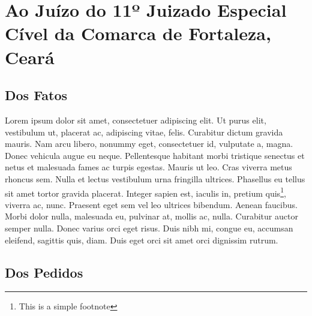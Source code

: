 \documentclass[
  12pt,
	oneside,
	a4paper,
	english,			%
	french,				%
	spanish,			%
  brazil
]{memoir}
\begin{document}
  \AddToShipoutPicture{\BackgroundPic}

\chapter{Ao Juízo do 11º Juizado Especial Cível da Comarca de Fortaleza, Ceará}

\lipsum[1]

\section{Dos Fatos}

Lorem ipsum dolor sit amet, consectetuer adipiscing elit. Ut purus elit,
vestibulum ut, placerat ac, adipiscing vitae, felis. Curabitur dictum gravida
mauris. Nam arcu libero, nonummy eget, consectetuer id, vulputate a, magna.
Donec vehicula augue eu neque. Pellentesque habitant morbi tristique senectus
et netus et malesuada fames ac turpis egestas. Mauris ut leo. Cras viverra
metus rhoncus sem. Nulla et lectus vestibulum urna fringilla ultrices.
Phasellus eu tellus sit amet tortor gravida placerat.  Integer sapien est,
iaculis in, pretium quis\footnote{This is a simple footnote}, viverra ac, nunc.
Praesent eget sem vel leo ultrices bibendum. Aenean faucibus. Morbi dolor
nulla, malesuada eu, pulvinar at, mollis ac, nulla. Curabitur auctor semper
nulla. Donec varius orci eget risus. Duis nibh mi, congue eu, accumsan
eleifend, sagittis quis, diam. Duis eget orci sit amet orci dignissim rutrum.

\begin{citacao}
\lipsum[1]
\end{citacao}

\lipsum[1-2]

\section{Dos Pedidos}
\lipsum[1-3]

\hoje{}
\end{document}
